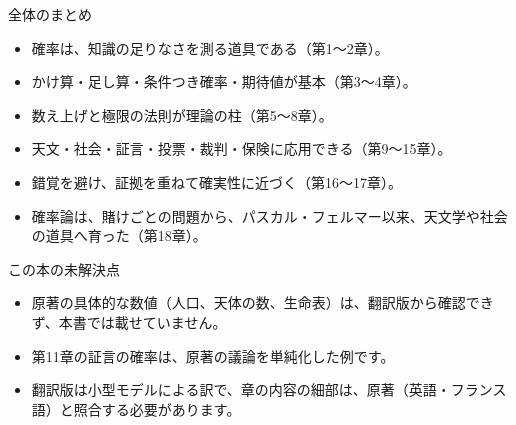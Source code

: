 \documentclass[a4paper,11pt,openany]{ltjsbook}
\begin{document}
\begin{pointbox}{全体のまとめ}
\begin{itemize}[leftmargin=1.5em]
\item 確率は、知識の足りなさを測る道具である（第1〜2章）。
\item かけ算・足し算・条件つき確率・期待値が基本（第3〜4章）。
\item 数え上げと極限の法則が理論の柱（第5〜8章）。
\item 天文・社会・証言・投票・裁判・保険に応用できる（第9〜15章）。
\item 錯覚を避け、証拠を重ねて確実性に近づく（第16〜17章）。
\item 確率論は、賭けごとの問題から、パスカル・フェルマー以来、天文学や社会の道具へ育った（第18章）。
\end{itemize}
\end{pointbox}

\begin{notebox}{この本の未解決点}
\begin{itemize}[leftmargin=1.5em]
\item 原著の具体的な数値（人口、天体の数、生命表）は、翻訳版から確認できず、本書では載せていません。
\item 第11章の証言の確率は、原著の議論を単純化した例です。
\item 翻訳版は小型モデルによる訳で、章の内容の細部は、原著（英語・フランス語）と照合する必要があります。
\end{itemize}
\end{notebox}
\end{document}
